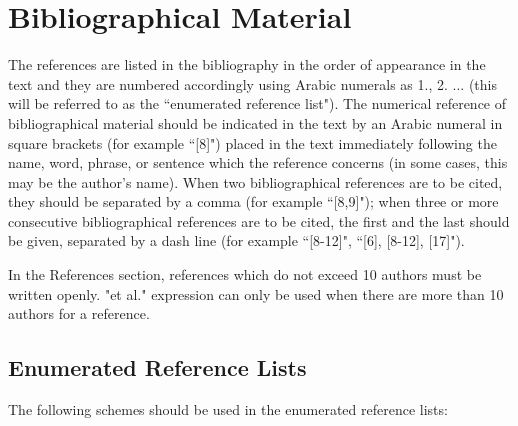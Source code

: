 \documentclass[a4paper,oneside,12pt]{report}
\numberwithin{equation}{chapter}
\begin{document}
\section{Bibliographical Material}

The references are listed in the bibliography in the order of appearance in the text and they are numbered accordingly using Arabic numerals as 1., 2. ... (this will be referred to as the ``enumerated reference list"). The numerical reference of bibliographical material should be indicated in the text by an Arabic numeral in square brackets (for example ``[8]") placed in the text immediately following the name, word, phrase, or sentence
which the reference concerns (in some cases, this may be the author's
name). When two bibliographical references are to be cited, they should be separated by a comma (for example ``[8,9]"); when three or more consecutive
bibliographical references are to be cited, the first and the last should be given, separated by a dash line (for example ``[8-12]", ``[6], [8-12], [17]").

In the References section, references which do not exceed 10 authors must be written openly. "et al." expression can only be used when there are more than 10 authors for a reference.


\subsection{Enumerated Reference Lists}

The following schemes should be used in the enumerated reference lists: 
\end{document}
